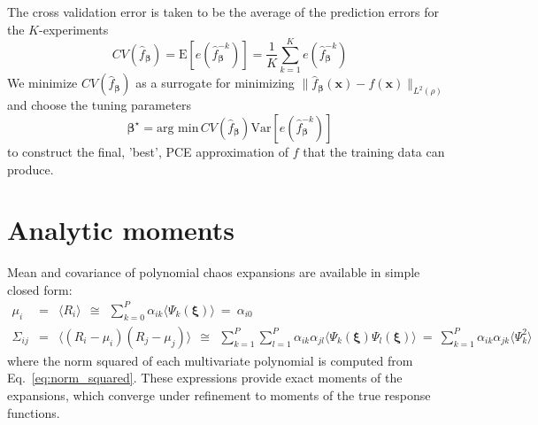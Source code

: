 The cross validation error is taken to be the average of the prediction errors for the $K$-experiments
\[
CV(\hat{f}_{\boldsymbol{\beta}}) = \mathrm{E}[e(\hat{f}_{\boldsymbol{\beta}}^{-k})] = \frac{1}{K}\sum_{k=1}^K e(\hat{f}_{\boldsymbol{\beta}}^{-k})
\]
We minimize $CV(\hat{f}_{\boldsymbol{\beta}})$ as a surrogate for minimizing
$\| \hat{f}_{\boldsymbol{\beta}}(\mathbf{x})-f(\mathbf{x})\|_{L^2(\rho)}$ and choose the tuning parameters 
\begin{equation}
\label{eq:optimal_tuning-parameters}
\boldsymbol{\beta}^\star = \text{arg min}\, CV(\hat{f}_{\boldsymbol{\beta}})\mathrm{Var}[e(\hat{f}_{\boldsymbol{\beta}}^{-k})]
\end{equation}
to construct the final, 'best',  PCE approximation of $f$ that the training data can produce. 

\section{Analytic moments} \label{uq:expansion:moment}

Mean and covariance of polynomial chaos expansions are available
in simple closed form:
\begin{eqnarray}
\mu_i      &=& \langle R_i \rangle ~~\cong~~ \sum_{k=0}^P \alpha_{ik} \langle 
\Psi_k(\boldsymbol{\xi}) \rangle ~=~ \alpha_{i0} \label{eq:mean_pce} \\
\Sigma_{ij} &=& \langle (R_i - \mu_i)(R_j - \mu_j) \rangle ~~\cong~~ 
\sum_{k=1}^P \sum_{l=1}^P \alpha_{ik} \alpha_{jl}
\langle \Psi_k(\boldsymbol{\xi}) \Psi_l(\boldsymbol{\xi}) \rangle ~=~
\sum_{k=1}^P \alpha_{ik}\alpha_{jk} \langle \Psi^2_k \rangle~~~~~~~~ \label{eq:covar_pce} 
\end{eqnarray}
where the norm squared of each multivariate polynomial is computed
from Eq.~\ref{eq:norm_squared}.  These expressions provide exact moments 
of the expansions, which converge under refinement to moments of the 
true response functions.

